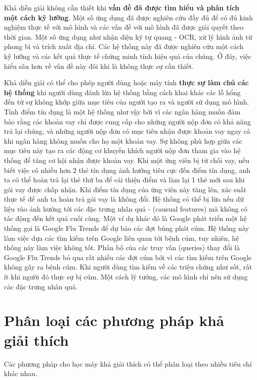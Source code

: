 Khả diễn giải không cần thiết khi \textbf{vấn đề đã được tìm hiểu và phân tích một cách kỹ lưỡng}. 
Một số ứng dụng đã được nghiên cứu đầy đủ để có đủ kinh nghiệm thực tế với mô hình và các vấn đề với mô hình đã được giải quyết theo thời gian. Một số ứng dụng như nhận diện ký tự quang - OCR, xử lý hình ảnh từ phong bì và trích xuất địa chỉ. Các hệ thống này đã được nghiên cứu một cách kỹ lưỡng và các kết quả thực tế chứng minh tính hiệu quả của chúng. Ở đây, việc hiểu sâu hơn về vấn đề này đôi khi là không thực sự cần thiết.


Khả diễn giải có thể cho phép người dùng hoặc máy tính \textbf{thực sự làm chủ các hệ thống} khi người dùng đánh lừa hệ thống  bằng cách khai khác các lỗ hổng đến từ sự không khớp giữa mục tiêu của người tạo ra và người sử dụng mô hình. Tính điểm tín dụng là một hệ thống như vậy bởi vì các ngân hàng muốn đảm bảo rằng các khoản vay chỉ được cung cấp cho những người nộp đơn có khả năng trả lại chúng, và những người nộp đơn có mục tiêu nhận được khoản vay ngay cả khi ngân hàng không muốn cho họ một khoản vay. Sự không phù hợp giữa các mục tiêu này tạo ra các động cơ khuyến khích người nộp đơn tham gia vào hệ thống để tăng cơ hội nhận được khoản vay. Khi một ứng viên bị từ chối vay, nếu biết việc có nhiều hơn 2 thẻ tín dụng ảnh hưởng tiêu cực đến điểm tín dụng, anh ta có thể hoàn trả lại thẻ thứ ba để cải thiện điểm và làm lại 1 thẻ mới sau khi gói vay được chấp nhận. Khi điểm tín dụng của ứng viên này tăng lên, xác suất thực tế để anh ta hoàn trả gói vay là không đổi. Hệ thống có thể bị lừa nếu dữ liệu vào ảnh hưởng tới các đặc trưng nhân quả - (causual features) mà không có tác động đến kết quả cuối cùng. Một ví dụ khác đó là Google phát triển một hệ thống gọi là Google Flu Trends để dự báo các đợt bùng phát cúm. Hệ thống này làm việc dựa các tìm kiếm trên Google liên quan tới bệnh cúm, tuy nhiên, hệ thống này làm việc không tốt. Phân bố của các truy vấn (queries) thay đổi là Google Flu Trends bỏ qua rất nhiều các đợt cúm bởi vì các tìm kiếm trên Google không gây ra bệnh cúm. Khi người dùng tìm kiếm về các triệu chứng như sốt, rất ít khi người đó thực sự bị cúm. Một cách lý tưởng, các mô hình chỉ nên sử dụng các đặc trưng nhân quả.

\clearpage

\section{Phân loại các phương pháp khả giải thích}

Các phương pháp cho học máy khả giải thích có thể phân loại theo nhiều tiêu chí khác nhau.

